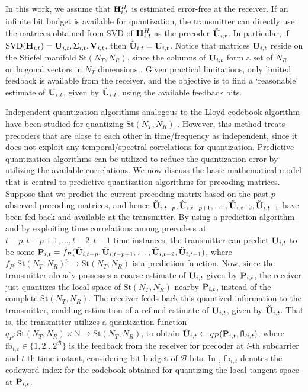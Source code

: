 \documentclass[conference]{IEEEtran}
\begin{document}
In this work, we assume that ${\bf H}^{H}_{i,t}$ is estimated error-free at the receiver.
If an infinite bit budget is available for quantization, the transmitter can directly use the matrices obtained from SVD of ${\bf H}^{H}_{i,t}$ as the precoder $\tilde{{\bf U}}_{i,t}$. 
In particular, if $\text{SVD}({\bf H}_{i,t}) = {\bf U}_{i,t},\Sigma_{i,t}, {\bf V}_{i,t}$, then $\tilde{{\bf U}}_{i,t} = {\bf U}_{i,t}$.
Notice that matrices ${\bf U}_{i,t}$ reside on the Stiefel manifold $\text{St}(N_T,N_R)$, since the columns of ${\bf U}_{i,t}$ form a set of $N_R$ orthogonal vectors in $N_T$ dimensions \cite{Gupt1905:Predictive,6891198}.
Given practical limitations, only limited feedback is available from the receiver, and the objective is to find a `reasonable' estimate of ${\bf U}_{i,t}$, given by $\tilde{{\bf U}}_{i,t}$, using the available feedback bits.

Independent quantization algorithms analogous to the Lloyd codebook algorithm have been studied for quantizing $\text{St}(N_T,N_R)$ \cite{6678348}.
However, this method treats precoders that are close to each other in time/frequency as independent, since it does not exploit any temporal/spectral correlations for quantization.
Predictive quantization algorithms \cite{Gupt1905:Predictive,6891198} can be utilized to reduce the quantization error by utilizing the available correlations. We now discuss the basic mathematical model that is central to predictive quantization algorithms for precoding matrices.
Suppose that we predict the current precoding matrix based on the past $p$ observed precoding matrices, and hence $\tilde{{\bf U}}_{i,t-p},\tilde{{\bf U}}_{i,t-p+1},\ldots,\tilde{{\bf U}}_{i,t-2},\tilde{{\bf U}}_{i,t-1}$ have been fed back and available at the transmitter.
By using a prediction algorithm and by exploiting time correlations among precoders at $t-p,t-p+1,\ldots,t-2,t-1$ time instances, the transmitter can predict ${\bf U}_{i,t}$ to be some ${\bf P}_{i,t}=f_P(\tilde{{\bf U}}_{i,t-p},\tilde{{\bf U}}_{i,t-p+1},\ldots,\tilde{{\bf U}}_{i,t-2},\tilde{{\bf U}}_{i,t-1})$, where $f_P: \text{St}(N_T,N_R)^p \to \text{St}(N_T,N_R)$ is a prediction function.
Now, since the transmitter already possesses a coarse estimate of ${\bf U}_{i,t}$ given by ${\bf P}_{i,t}$, the receiver just quantizes the local space of $\text{St}(N_T,N_R)$ nearby ${\bf P}_{i,t}$, instead of the complete $\text{St}(N_T,N_R)$. The receiver feeds back this quantized information to the transmitter, enabling estimation of a refined estimate of ${\bf U}_{i,t}$, given by $\tilde{{\bf U}}_{i,t}$.
That is, the transmitter utilizes a quantization function $q_P:\text{St}(N_T,N_R) \times \mathbb{N} \to \text{St}(N_T,N_R)$, to obtain $\tilde{{\bf U}}_{i,t} \gets q_P({\bf P}_{i,t},\text{fb}_{i,t})$, where $\text{fb}_{i,t} \in \{1,2\ldots2^{\mathcal{B}}\}$ is the feedback from the receiver for precoder at $i$-th subcarrier and $t$-th time instant, considering bit budget of $\mathcal{B}$ bits.
In \cite{Gupt1905:Predictive,6891198,6545375}, $\text{fb}_{i,t}$ denotes the codeword index for the codebook obtained for quantizing the local tangent space at ${\bf P}_{i,t}$.
\end{document}
